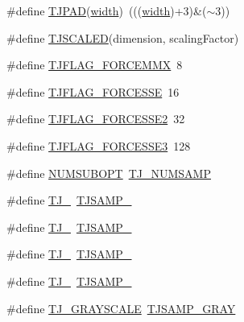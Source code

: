\begin{DoxyCompactItemize}
\#define \hyperlink{group___turbo_j_p_e_g_ga0aba955473315e405295d978f0c16511}{T\+J\+P\+AD}(\hyperlink{png_8h_ad46179dbe9c68fdcea52b34c3480ec0f}{width})~(((\hyperlink{png_8h_ad46179dbe9c68fdcea52b34c3480ec0f}{width})+3)\&($\sim$3))
\item 
\#define \hyperlink{group___turbo_j_p_e_g_ga84878bb65404204743aa18cac02781df}{T\+J\+S\+C\+A\+L\+ED}(dimension,  scaling\+Factor)
\item 
\#define \hyperlink{group___turbo_j_p_e_g_ga4e872f11c82f241736fa8297920f24e5}{T\+J\+F\+L\+A\+G\+\_\+\+F\+O\+R\+C\+E\+M\+MX}~8
\item 
\#define \hyperlink{group___turbo_j_p_e_g_gae17e63189e8cd730feed3efbd2454f38}{T\+J\+F\+L\+A\+G\+\_\+\+F\+O\+R\+C\+E\+S\+SE}~16
\item 
\#define \hyperlink{group___turbo_j_p_e_g_ga8cf0bca96ea4d472563f4b0ebf8c48e7}{T\+J\+F\+L\+A\+G\+\_\+\+F\+O\+R\+C\+E\+S\+S\+E2}~32
\item 
\#define \hyperlink{group___turbo_j_p_e_g_gaf9d49066633404da4386d70820295dd2}{T\+J\+F\+L\+A\+G\+\_\+\+F\+O\+R\+C\+E\+S\+S\+E3}~128
\item 
\#define \hyperlink{group___turbo_j_p_e_g_ga35ff7fc477ba0b7c2e5a5aaade105ed0}{N\+U\+M\+S\+U\+B\+O\+PT}~\hyperlink{group___turbo_j_p_e_g_ga5ef3d169162ce77ce348e292a0b7477c}{T\+J\+\_\+\+N\+U\+M\+S\+A\+MP}
\item 
\#define \hyperlink{group___turbo_j_p_e_g_gafe8e20feac4fe47c8c4b71dcaef20893}{T\+J\+\_}~\hyperlink{group___turbo_j_p_e_g_gga1d047060ea80bb9820d540bb928e9074afb8da4f44197837bdec0a4f593dacae3}{T\+J\+S\+A\+M\+P\+\_}
\item 
\#define \hyperlink{group___turbo_j_p_e_g_gab26ee1951b0863d33064f63e09192d53}{T\+J\+\_}~\hyperlink{group___turbo_j_p_e_g_gga1d047060ea80bb9820d540bb928e9074a136130902cc578f11f32429b59368404}{T\+J\+S\+A\+M\+P\+\_}
\item 
\#define \hyperlink{group___turbo_j_p_e_g_gafae617ab226e88492ae5c5708e52503f}{T\+J\+\_}~\hyperlink{group___turbo_j_p_e_g_gga1d047060ea80bb9820d540bb928e9074a63085dbf683cfe39e513cdb6343e3737}{T\+J\+S\+A\+M\+P\+\_}
\item 
\#define \hyperlink{group___turbo_j_p_e_g_ga5d60f3d82faeb4158eac13981862a46c}{T\+J\+\_}~\hyperlink{group___turbo_j_p_e_g_gga1d047060ea80bb9820d540bb928e9074a63085dbf683cfe39e513cdb6343e3737}{T\+J\+S\+A\+M\+P\+\_}
\item 
\#define \hyperlink{group___turbo_j_p_e_g_ga583dcd76ffd040dd51e456729a3e87fe}{T\+J\+\_\+\+G\+R\+A\+Y\+S\+C\+A\+LE}~\hyperlink{group___turbo_j_p_e_g_gga1d047060ea80bb9820d540bb928e9074a3f1c9504842ddc7a48d0f690754b6248}{T\+J\+S\+A\+M\+P\+\_\+\+G\+R\+AY}

\end{DoxyCompactItemize}
